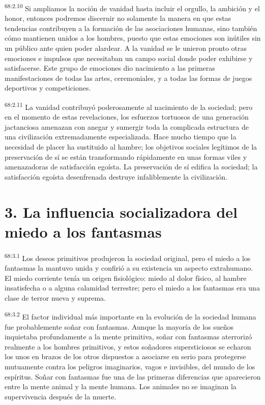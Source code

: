 \par
\textsuperscript{68:2.10} Si ampliamos la noción de vanidad hasta incluir el orgullo, la ambición y el honor, entonces podremos discernir no solamente la manera en que estas tendencias contribuyen a la formación de las asociaciones humanas, sino también cómo mantienen unidos a los hombres, puesto que estas emociones son inútiles sin un público ante quien poder alardear. A la vanidad se le unieron pronto otras emociones e impulsos que necesitaban un campo social donde poder exhibirse y satisfacerse. Este grupo de emociones dio nacimiento a las primeras manifestaciones de todas las artes, ceremoniales, y a todas las formas de juegos deportivos y competiciones.

\par
\textsuperscript{68:2.11} La vanidad contribuyó poderosamente al nacimiento de la sociedad; pero en el momento de estas revelaciones, los esfuerzos tortuosos de una generación jactanciosa amenazan con anegar y sumergir toda la complicada estructura de una civilización extremadamente especializada. Hace mucho tiempo que la necesidad de placer ha sustituido al hambre; los objetivos sociales legítimos de la preservación de sí se están transformando rápidamente en unas formas viles y amenazadoras de satisfacción egoísta. La preservación de sí edifica la sociedad; la satisfacción egoísta desenfrenada destruye infaliblemente la civilización.

\section*{3. La influencia socializadora del miedo a los fantasmas}
\par
\textsuperscript{68:3.1} Los deseos primitivos produjeron la sociedad original, pero el miedo a los fantasmas la mantuvo unida y confirió a su existencia un aspecto extrahumano. El miedo corriente tenía un origen fisiológico: miedo al dolor físico, al hambre insatisfecha o a alguna calamidad terrestre; pero el miedo a los fantasmas era una clase de terror nueva y suprema.

\par
\textsuperscript{68:3.2} El factor individual más importante en la evolución de la sociedad humana fue probablemente soñar con fantasmas. Aunque la mayoría de los sueños inquietaba profundamente a la mente primitiva, soñar con fantasmas aterrorizó realmente a los hombres primitivos, y estos soñadores supersticiosos se echaron los unos en brazos de los otros dispuestos a asociarse en serio para protegerse mutuamente contra los peligros imaginarios, vagos e invisibles, del mundo de los espíritus. Soñar con fantasmas fue una de las primeras diferencias que aparecieron entre la mente animal y la mente humana. Los animales no se imaginan la supervivencia después de la muerte.

